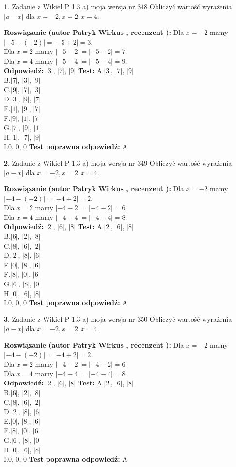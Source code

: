 \documentclass[12pt, a4paper]{article}
\theoremstyle{definition} %
\newtheorem{zad}{}
\newcommand{\zadStart}[1]{\begin{zad}#1\newline}
\newcommand{\zadStop}{\end{zad}}
\newcommand{\rozwStart}[2]{\noindent \textbf{Rozwiązanie (autor #1 , recenzent #2): }\newline}
\newcommand{\rozwStop}{\newline}
\newcommand{\odpStart}{\noindent \textbf{Odpowiedź:}\newline}
\newcommand{\odpStop}{\newline}
\newcommand{\testStart}{\noindent \textbf{Test:}\newline}
\newcommand{\testStop}{\newline}
\newcommand{\kluczStart}{\noindent \textbf{Test poprawna odpowiedź:}\newline}
\newcommand{\kluczStop}{\newline}
\begin{document}
\zadStart{Zadanie z Wikieł P 1.3 a) moja wersja nr 348}
Obliczyć wartość wyrażenia $|a - x|$ dla $x=-2,x=2,x=4$.
\zadStop
\rozwStart{Patryk Wirkus}{}
Dla $x = -2$ mamy $|-5 - (-2)| = |-5 + 2| = 3$.\\
Dla $x = 2$ mamy $|-5 - 2| = |-5 - 2| = 7$.\\
Dla $x = 4$ mamy $|-5 - 4| = |-5 - 4| = 9$.\\
\rozwStop
\odpStart
$|3|$, $|7|$, $|9|$
\odpStop
\testStart
A.$|3|$, $|7|$, $|9|$\\
B.$|7|$, $|3|$, $|9|$\\
C.$|9|$, $|7|$, $|3|$\\
D.$|3|$, $|9|$, $|7|$\\
E.$|1|$, $|9|$, $|7|$\\
F.$|9|$, $|1|$, $|7|$\\
G.$|7|$, $|9|$, $|1|$\\
H.$|1|$, $|7|$, $|9|$\\
I.$0$, $0$, $0$
\testStop
\kluczStart
A
\kluczStop



\zadStart{Zadanie z Wikieł P 1.3 a) moja wersja nr 349}
Obliczyć wartość wyrażenia $|a - x|$ dla $x=-2,x=2,x=4$.
\zadStop
\rozwStart{Patryk Wirkus}{}
Dla $x = -2$ mamy $|-4 - (-2)| = |-4 + 2| = 2$.\\
Dla $x = 2$ mamy $|-4 - 2| = |-4 - 2| = 6$.\\
Dla $x = 4$ mamy $|-4 - 4| = |-4 - 4| = 8$.\\
\rozwStop
\odpStart
$|2|$, $|6|$, $|8|$
\odpStop
\testStart
A.$|2|$, $|6|$, $|8|$\\
B.$|6|$, $|2|$, $|8|$\\
C.$|8|$, $|6|$, $|2|$\\
D.$|2|$, $|8|$, $|6|$\\
E.$|0|$, $|8|$, $|6|$\\
F.$|8|$, $|0|$, $|6|$\\
G.$|6|$, $|8|$, $|0|$\\
H.$|0|$, $|6|$, $|8|$\\
I.$0$, $0$, $0$
\testStop
\kluczStart
A
\kluczStop



\zadStart{Zadanie z Wikieł P 1.3 a) moja wersja nr 350}
Obliczyć wartość wyrażenia $|a - x|$ dla $x=-2,x=2,x=4$.
\zadStop
\rozwStart{Patryk Wirkus}{}
Dla $x = -2$ mamy $|-4 - (-2)| = |-4 + 2| = 2$.\\
Dla $x = 2$ mamy $|-4 - 2| = |-4 - 2| = 6$.\\
Dla $x = 4$ mamy $|-4 - 4| = |-4 - 4| = 8$.\\
\rozwStop
\odpStart
$|2|$, $|6|$, $|8|$
\odpStop
\testStart
A.$|2|$, $|6|$, $|8|$\\
B.$|6|$, $|2|$, $|8|$\\
C.$|8|$, $|6|$, $|2|$\\
D.$|2|$, $|8|$, $|6|$\\
E.$|0|$, $|8|$, $|6|$\\
F.$|8|$, $|0|$, $|6|$\\
G.$|6|$, $|8|$, $|0|$\\
H.$|0|$, $|6|$, $|8|$\\
I.$0$, $0$, $0$
\testStop
\kluczStart
A
\kluczStop
\end{document}
